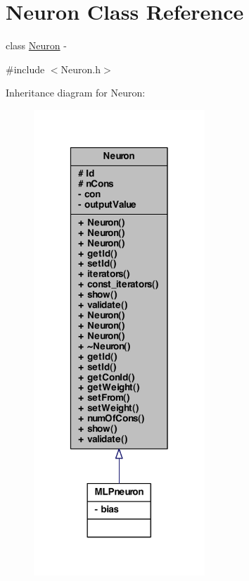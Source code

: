 \hypertarget{class_neuron}{
\section{Neuron Class Reference}
\label{class_neuron}
}


class \hyperlink{class_neuron}{Neuron} -\/  




{\ttfamily \#include $<$Neuron.h$>$}



Inheritance diagram for Neuron:
\nopagebreak
\begin{figure}[H]
\begin{center}
\leavevmode
\includegraphics[width=182pt]{class_neuron__inherit__graph}
\end{center}
\end{figure}


